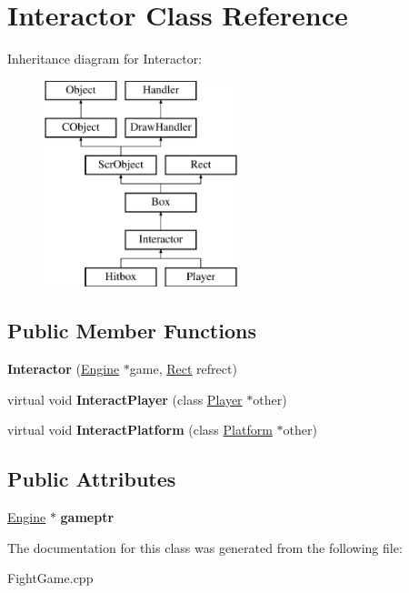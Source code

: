 \hypertarget{class_interactor}{}\section{Interactor Class Reference}
\label{class_interactor}
Inheritance diagram for Interactor\+:\begin{figure}[H]
\begin{center}
\leavevmode
\includegraphics[height=6.000000cm]{class_interactor}
\end{center}
\end{figure}
\subsection*{Public Member Functions}
\begin{DoxyCompactItemize}
\item 
\hypertarget{class_interactor_afc2618cc8be769042fe84635f06baf14}{}\label{class_interactor_afc2618cc8be769042fe84635f06baf14} 
{\bfseries Interactor} (\hyperlink{class_engine}{Engine} $\ast$game, \hyperlink{class_rect}{Rect} refrect)
\item 
\hypertarget{class_interactor_a74fee5038189de32aae82d0358301b4b}{}\label{class_interactor_a74fee5038189de32aae82d0358301b4b} 
virtual void {\bfseries Interact\+Player} (class \hyperlink{class_player}{Player} $\ast$other)
\item 
\hypertarget{class_interactor_ae01bc3e9dcefe9e416b9da9d71cf4e82}{}\label{class_interactor_ae01bc3e9dcefe9e416b9da9d71cf4e82} 
virtual void {\bfseries Interact\+Platform} (class \hyperlink{class_platform}{Platform} $\ast$other)
\end{DoxyCompactItemize}
\subsection*{Public Attributes}
\begin{DoxyCompactItemize}
\item 
\hypertarget{class_interactor_a7349dd40ae48b78a4e491b41a373ba90}{}\label{class_interactor_a7349dd40ae48b78a4e491b41a373ba90} 
\hyperlink{class_engine}{Engine} $\ast$ {\bfseries gameptr}
\end{DoxyCompactItemize}


The documentation for this class was generated from the following file\+:\begin{DoxyCompactItemize}
\item 
Fight\+Game.\+cpp\end{DoxyCompactItemize}
